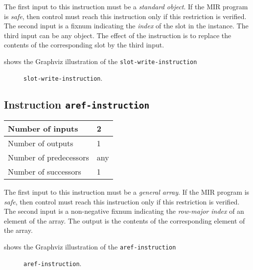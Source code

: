 The first input to this instruction must be a \emph{standard object}.
If the MIR program is \emph{safe}, then control must reach this
instruction only if this restriction is verified.  The second input is
a fixnum indicating the \emph{index} of the slot in the instance.  The
third input can be any object.  The effect of the instruction is to
replace the contents of the corresponding slot by the third input.

 shows the Graphviz illustration of the
\texttt{slot-write-instruction}

\begin{figure}
\begin{center}
\end{center}
\caption{\label{fig-slot-write-instruction}
\texttt{slot-write-instruction}.}
\end{figure}

\subsection{Instruction \texttt{aref-instruction}}
\label{mir-instruction-aref}

\begin{tabular}{|l|l|}
\hline
Number of inputs & 2\\
\hline
Number of outputs & 1\\
\hline
Number of predecessors & any\\
\hline
Number of successors & 1\\
\hline
\end{tabular}

The first input to this instruction must be a \emph{general array}.
If the MIR program is \emph{safe}, then control must reach this
instruction only if this restriction is verified.  The second input is
a non-negative fixnum indicating the \emph{row-major index} of an
element of the array.  The output is the contents of the corresponding
element of the array.

 shows the Graphviz illustration of the
\texttt{aref-instruction}

\begin{figure}
\begin{center}
\end{center}
\caption{\label{fig-aref-instruction}
\texttt{aref-instruction}.}
\end{figure}

